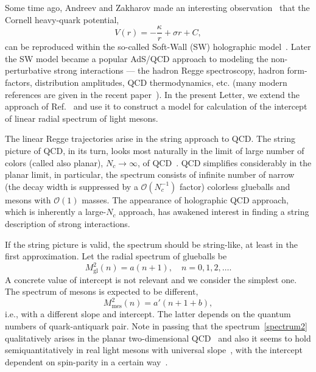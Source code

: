\documentclass[a4paper,11pt]{article}
\begin{document}
Some time ago, Andreev and Zakharov made an interesting observation~\cite{Andreev:2006ct}
that the Cornell heavy-quark potential,
\begin{equation}
\label{cornell}
V(r)=-\frac{\kappa}{r}+\sigma r + C,
\end{equation}
can be reproduced within the so-called Soft-Wall (SW) holographic model~\cite{son2,andreev}.
Later the SW model became a popular AdS/QCD approach to modeling the non-perturbative strong interactions ---
the hadron Regge spectroscopy, hadron form-factors, distribution amplitudes, QCD thermodynamics,
etc. (many modern references are given in the recent paper~\cite{Afonin:2021cwo}). In the present Letter,
we extend the approach of Ref.~\cite{Andreev:2006ct} and use it to construct a model for calculation of the
intercept of linear radial spectrum of light mesons.

The linear Regge trajectories arise in the string approach to QCD. The string picture of QCD, in its turn,
looks most naturally in the limit of large number of colors (called also planar),  \(N_c\to\infty\), of QCD~\cite{hoof,wit}.
QCD simplifies considerably in the planar limit, in particular, the spectrum consists of infinite number of narrow
(the decay width is suppressed by a $\mathcal{O}(N_c^{-1})$ factor)
colorless glueballs and mesons with $\mathcal{O}(1)$ masses.
The appearance of holographic QCD approach, which is inherently a large-$N_c$ approach, has awakened interest in
finding a string description of strong interactions.

If the string picture is valid, the spectrum should be string-like, at least in the first approximation.
Let the radial spectrum of glueballs be
\begin{equation}
\label{spectrum1}
  M^2_\text{gl}(n)=a(n+1),\quad n=0,1,2,\dots.
\end{equation}
A concrete value of intercept is not relevant and we consider the simplest one.
The spectrum of mesons is expected to be different,
\begin{equation}
\label{spectrum2}
  M^2_\text{mes}(n)=a'(n+1+b),
\end{equation}
i.e., with a different slope and intercept. The latter depends on the quantum numbers of quark-antiquark pair.
Note in passing that the spectrum~\eqref{spectrum2} qualitatively arises in the planar two-dimensional QCD~\cite{hoof2D}
and also it seems to hold semiquantitatively in real light mesons with universal slope~\cite{Anisovich:2000kxa,Bugg:2004xu,Klempt:2007cp,
Li:2004gu,Shifman:2007xn,Afonin:2006vi,Afonin:2006wt,Afonin:2007jd,Afonin:2007aa}, with the
intercept dependent on spin-parity in a certain way~\cite{Afonin:2006vi,Afonin:2006wt,
Afonin:2007jd,Afonin:2007aa}.
\end{document}
